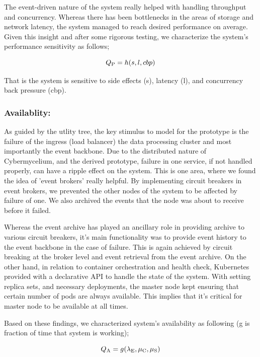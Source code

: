 \documentclass[review]{elsarticle}
\begin{document}
The event-driven nature of the system really helped with handling throughput and concurrency. Whereas there has been bottlenecks in the areas of storage and network latency, the system managed to reach desired performance on average. Given this insight and after some rigorous testing, we characterize the system's performance sensitivity as follows;

\begin{equation}
    Q\textsubscript{P} = h(s, l, cbp)
\end{equation}

That is the system is sensitive to side effects (s), latency (l), and concurrency back pressure (cbp).

\subsubsection{Availablity:}

As guided by the utlity tree, the key stimulus to model for the prototype is the failure of the ingress (load balancer)  the data processing cluster and most importantly the event backbone. Due to the distributed nature of Cybermycelium, and the derived prototype, failure in one service, if not handled properly, can have a ripple effect on the system. This is one area, where we found the idea of 'event brokers' really helpful. By implementing circuit breakers in event brokers, we prevented the other nodes of the system to be affected by failure of one. We also archived the events that the node was about to receive before it failed.

Whereas the event archive has played an ancillary role in providing archive to various circuit breakers, it's main functionality was to provide event history to the event backbone in the case of failure. This is again achieved by circuit breaking at the broker level and event retrieval from the event archive. On the other hand, in relation to container orchestration and health check, Kubernetes provided with a declarative API to handle the state of the system. With setting replica sets, and necessary deployments, the master node kept ensuring that certain number of pods are always available. This implies that it's critical for master node to be available at all times.

Based on these findings, we characterized system's availability as following (g is fraction of time that system is working);

\begin{equation}
    Q\textsubscript{A} = g(\lambda\textsubscript{E} , \mu\textsubscript{C}, \mu\textsubscript{S})
\end{equation}
\end{document}
